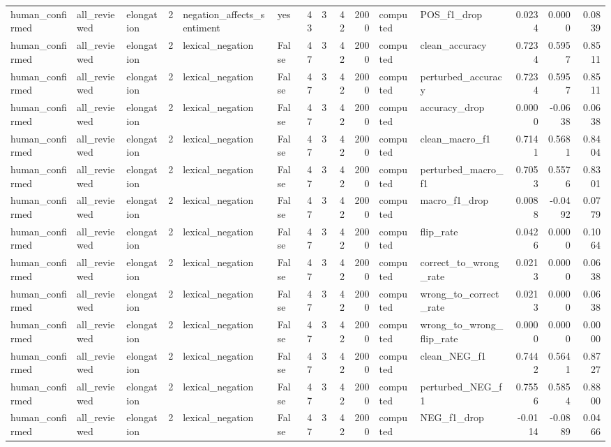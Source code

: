 \begin{tabular}{lllrllrrrrllrrr}
human_confirmed & all_reviewed & elongation & 2 & negation_affects_sentiment & yes & 43 & 3 & 42 & 2000 & computed & POS_f1_drop & 0.0234 & 0.0000 & 0.0839 \\
human_confirmed & all_reviewed & elongation & 2 & lexical_negation & False & 47 & 3 & 42 & 2000 & computed & clean_accuracy & 0.7234 & 0.5957 & 0.8511 \\
human_confirmed & all_reviewed & elongation & 2 & lexical_negation & False & 47 & 3 & 42 & 2000 & computed & perturbed_accuracy & 0.7234 & 0.5957 & 0.8511 \\
human_confirmed & all_reviewed & elongation & 2 & lexical_negation & False & 47 & 3 & 42 & 2000 & computed & accuracy_drop & 0.0000 & -0.0638 & 0.0638 \\
human_confirmed & all_reviewed & elongation & 2 & lexical_negation & False & 47 & 3 & 42 & 2000 & computed & clean_macro_f1 & 0.7141 & 0.5681 & 0.8404 \\
human_confirmed & all_reviewed & elongation & 2 & lexical_negation & False & 47 & 3 & 42 & 2000 & computed & perturbed_macro_f1 & 0.7053 & 0.5576 & 0.8301 \\
human_confirmed & all_reviewed & elongation & 2 & lexical_negation & False & 47 & 3 & 42 & 2000 & computed & macro_f1_drop & 0.0088 & -0.0492 & 0.0779 \\
human_confirmed & all_reviewed & elongation & 2 & lexical_negation & False & 47 & 3 & 42 & 2000 & computed & flip_rate & 0.0426 & 0.0000 & 0.1064 \\
human_confirmed & all_reviewed & elongation & 2 & lexical_negation & False & 47 & 3 & 42 & 2000 & computed & correct_to_wrong_rate & 0.0213 & 0.0000 & 0.0638 \\
human_confirmed & all_reviewed & elongation & 2 & lexical_negation & False & 47 & 3 & 42 & 2000 & computed & wrong_to_correct_rate & 0.0213 & 0.0000 & 0.0638 \\
human_confirmed & all_reviewed & elongation & 2 & lexical_negation & False & 47 & 3 & 42 & 2000 & computed & wrong_to_wrong_flip_rate & 0.0000 & 0.0000 & 0.0000 \\
human_confirmed & all_reviewed & elongation & 2 & lexical_negation & False & 47 & 3 & 42 & 2000 & computed & clean_NEG_f1 & 0.7442 & 0.5641 & 0.8727 \\
human_confirmed & all_reviewed & elongation & 2 & lexical_negation & False & 47 & 3 & 42 & 2000 & computed & perturbed_NEG_f1 & 0.7556 & 0.5854 & 0.8800 \\
human_confirmed & all_reviewed & elongation & 2 & lexical_negation & False & 47 & 3 & 42 & 2000 & computed & NEG_f1_drop & -0.0114 & -0.0889 & 0.0466 \\

\end{tabular}

